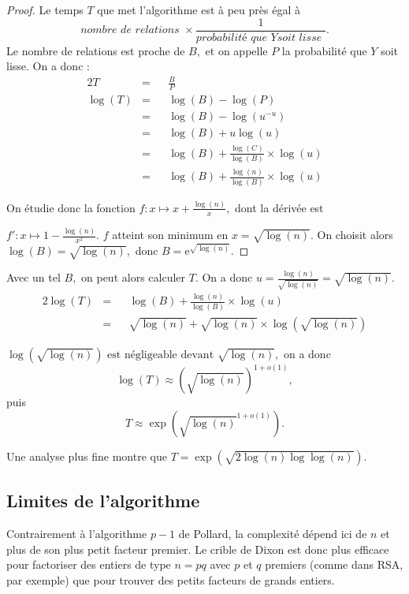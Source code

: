 \documentclass[french, 12pt, titlepage]{article}
\begin{document}
\begin{proof}

Le temps $T$ que met l'algorithme est à peu près égal à
\[\textit{nombre de relations } \times \frac{1}{\textit{probabilité que
  } Y \textit{soit lisse }}.\] Le nombre de relations est proche de $B,$ et on
appelle $P$ la probabilité que $Y$ soit lisse. On a donc : 
\begin{alignat*}{2}
T & = && \frac{B}{P} \\
\log(T) & = && \log(B) - \log(P) \\
 & = && \log(B) - \log(u^{-u}) \\
 & = && \log(B) + u\log(u) \\
 & = && \log(B) + \frac{\log(C)}{\log(B)} \times \log(u) \\
 & = && \log(B) + \frac{\log(n)}{\log(B)} \times \log(u)
\end{alignat*}     

On étudie donc la fonction $f : x \mapsto x + \frac{\log(n)}{x},$ dont
la dérivée est 

\noindent $f' : x \mapsto 1 - \frac{\log(n)}{x^2}.$ $f$ atteint
son minimum en $x = \sqrt{\log(n)}.$ On choisit alors $\log(B) = \sqrt{\log(n)},$ donc $B = \text{e}^{\sqrt{\log(n)}}.$ 
\end{proof}

Avec un tel $B,$ on peut alors calculer $T.$ On a donc $u = \frac{\log(n)}{\sqrt{\log(n)}} = \sqrt{\log(n)}.$
\begin{alignat*}{2}
\log(T) & = && \log(B) + \frac{\log(n)}{\log(B)} \times \log(u) \\
 & = && \sqrt{\log(n)} + \sqrt{\log(n)} \times \log(\sqrt{\log(n)}) 
\end{alignat*}

$\log(\sqrt{\log(n)}) \text{ est négligeable devant } \sqrt{\log(n)},$
on a donc
\[\log(T) \approx (\sqrt{\log(n)})^{1+o(1)},\] puis
\[T \approx \exp(\sqrt{\log(n)}^{1+o(1)}).\]

Une analyse plus fine montre que $T = \exp(\sqrt{2\log(n)\log\log(n)}).$

\subsection{Limites de l'algorithme}

Contrairement à l'algorithme $p - 1$ de Pollard, la complexité dépend
ici de $n$ et plus de son plus petit facteur premier. Le crible de
Dixon est donc plus efficace pour factoriser des entiers de type $n =
pq$ avec $p$ et $q$ premiers (comme dans RSA, par exemple) que pour trouver des petits facteurs de
grands entiers.
\end{document}

